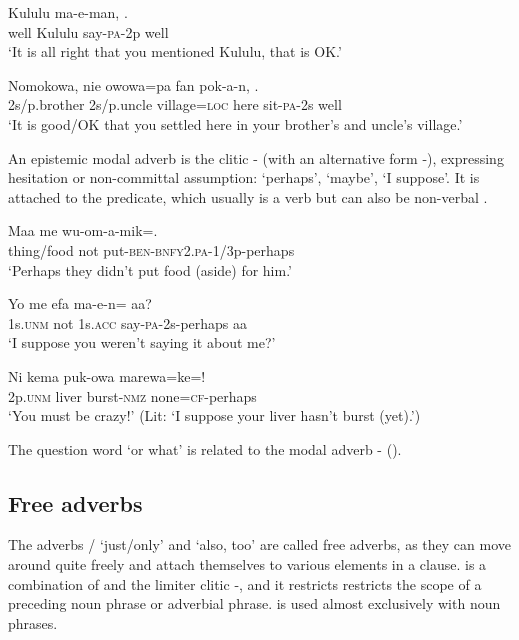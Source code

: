 \ea%
\label{ex:3:x515}
\gll {} Kululu ma-e-man, . \\
well Kululu say-\textsc{pa}-2p well\\
\glt`It is all right that you mentioned Kululu, that is OK.'
\z

\ea%
\label{ex:3:x516}
\gll Nomokowa, nie owowa=pa fan pok-a-n, . \\
2s/p.brother 2s/p.uncle village=\textsc{loc} here sit-\textsc{pa}-2s well\\
\glt`It is good/OK that you settled here in your brother's and uncle's village.'
\z

An epistemic modal adverb is the clitic - (with an alternative form -), expressing hesitation or non-committal assumption: `perhaps', `maybe', `I suppose'. It is attached to the predicate, which usually is a verb but can also be non-verbal .

\ea%
\label{ex:3:x517}
\gll Maa me wu-om-a-mik=. \\
thing/food not put-\textsc{ben}-\textsc{bnfy}2.\textsc{pa}-1/3p-perhaps\\
\glt`Perhaps they didn't put food (aside) for him.'
\z

\ea%
\label{ex:3:x518}
\gll Yo me efa ma-e-n= aa? \\
1s.\textsc{unm} not 1s.\textsc{acc} say-\textsc{pa}-2s-perhaps aa\\
\glt`I suppose you weren't saying it about me?'
\z

\ea%
\label{ex:3:x519}
\gll Ni kema puk-owa marewa=ke=! \\
2p.\textsc{unm} liver burst-\textsc{nmz} none=\textsc{cf}-perhaps\\
\glt`You must be crazy!' (Lit: `I suppose your liver hasn't burst (yet).')
\z

The question word  `or what' is related to the modal adverb - ().

\subsection{Free adverbs}\label{sec:3:y:x}
{}
The adverbs \textstyleStyleVernacularWordsItalic{)}/ `just/only' and  `also, too' are called free adverbs, as they can move around quite freely and attach themselves to various elements in a clause.  is a combination of  and the limiter clitic \nobreakdash-, and it restricts restricts the scope of a preceding noun phrase or adverbial phrase.  is used almost exclusively with noun phrases.

